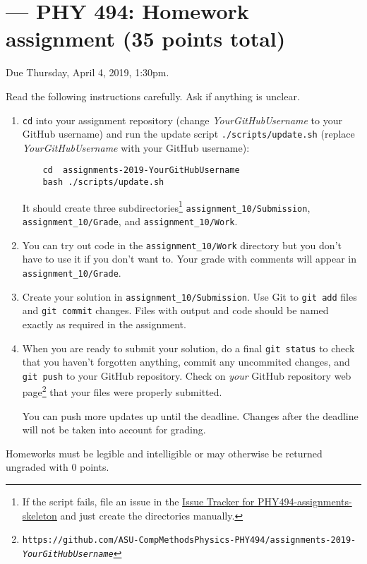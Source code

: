 \documentclass[letterpaper]{scrartcl}
\newcommand{\anumber}{10}
\newcommand{\anum}{\anumber}
\begin{document}

\setcounter{section}{\anumber}
\addtocounter{section}{-1}
\section{ --- PHY 494: Homework assignment (35 points total)}

\noindent Due Thursday, April 4, 2019, 1:30pm.

\noindent
Read the following instructions carefully. Ask if anything is unclear.
\begin{enumerate}
\item \texttt{cd} into your assignment repository (change
  \emph{YourGitHubUsername} to your GitHub username) and run the
  update script \texttt{./scripts/update.sh} (replace
  \emph{YourGitHubUsername} with your GitHub username):
  \begin{verbatim}
    cd  assignments-2019-YourGitHubUsername
    bash ./scripts/update.sh
  \end{verbatim}
  It should create three subdirectories\footnote{If the script fails,
    file an issue in the
    \href{https://github.com/ASU-CompMethodsPhysics-PHY494/PHY494-assignments-skeleton/issues}{Issue
      Tracker for PHY494-assignments-skeleton} and just create the
    directories manually.} \texttt{assignment\_\anum/Submission},
  \texttt{assignment\_\anum/Grade}, and
  \texttt{assignment\_\anum/Work}.
\item You can try out code in the \texttt{assignment\_\anum/Work}
  directory but you don't have to use it if you don't want to. Your
  grade with comments will appear in
  \texttt{assignment\_\anum/Grade}.
\item Create your solution in
  \texttt{assignment\_\anum/Submission}. Use Git to \texttt{git add}
  files and \texttt{git commit} changes. Files with output and code
  should be named exactly as required in the assignment.
\item When you are ready to submit your solution, do a final
  \texttt{git status} to check that you haven't forgotten anything,
  commit any uncommited changes, and \texttt{git push} to your GitHub
  repository. Check on \emph{your} GitHub repository web
  page\footnote{\texttt{https://github.com/ASU-CompMethodsPhysics-PHY494/assignments-2019-\emph{YourGitHubUsername}}}
  that your files were properly submitted.

  You can push more updates up until the deadline. Changes after the
  deadline will not be taken into account for grading.
\end{enumerate}
Homeworks must be legible and intelligible or may otherwise be
returned ungraded with 0 points.
\end{document}
